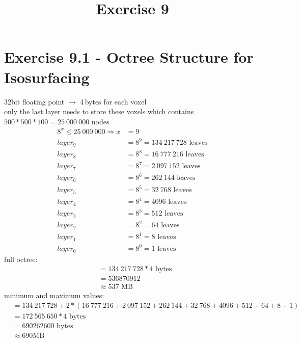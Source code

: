 \documentclass[a4paper]{article}
\date{}
\author{}
\title{Exercise 9}
\begin{document}
\maketitle 
\thispagestyle{fancy}


\section*{Exercise 9.1 - Octree Structure for Isosurfacing}

32bit floating point $\rightarrow$ 4\,bytes for each voxel\\
only the last layer needs to store these voxels which contains $ 500*500*100 = 25\ 000\ 000 $ nodes
\begin{align*}
8^x \leq 25\ 000\ 000 \Rightarrow x &= 9\\
layer_{9} &= 8^9 = 134\ 217\ 728 \text{ leaves}\\
layer_{8} &= 8^8 = 16\ 777\ 216 \text{ leaves}\\
layer_{7} &= 8^7 = 2\ 097\ 152 \text{ leaves}\\
layer_{6} &= 8^6 = 262\ 144 \text{ leaves}\\
layer_{5} &= 8^5 = 32\ 768 \text{ leaves}\\
layer_{4} &= 8^4 = 4096 \text{ leaves}\\
layer_{3} &= 8^3 = 512 \text{ leaves}\\
layer_{2} &= 8^2 = 64 \text{ leaves}\\
layer_{1} &= 8^1 = 8 \text{ leaves}\\
layer_{0} &= 8^0 = 1 \text{ leaves}
\end{align*}
full octree: \\
\begin{align*}
&= 134\ 217\ 728 * 4 \text{ bytes}\\
&= 536870912\\
&\approx 537\text{ MB}
\end{align*}
minimum and maximum values:\\
\begin{align*}
&= 134\ 217\ 728 + 2*(16\ 777\ 216 + 2\ 097\ 152 + 262\ 144 + 32\ 768 + 4096 + 512 + 64 + 8 + 1)\\
&= 172\ 565\ 650 * 4 \text{ bytes} \\
&= 690262600 \text{ bytes}\\
&\approx 690 \text{MB}
\end{align*}
\end{document}
